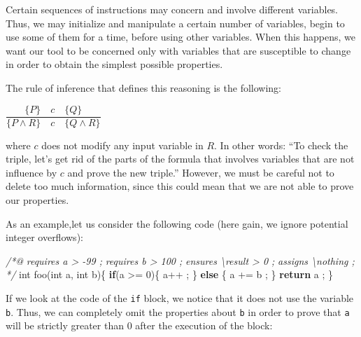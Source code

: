 \documentclass[12pt,francais,]{scrbook}
\newenvironment{Shaded}{}{}
\newcommand{\KeywordTok}[1]{\textcolor[rgb]{0.00,0.44,0.13}{\textbf{{#1}}}}
\newcommand{\DataTypeTok}[1]{\textcolor[rgb]{0.56,0.13,0.00}{{#1}}}
\newcommand{\DecValTok}[1]{\textcolor[rgb]{0.25,0.63,0.44}{{#1}}}
\newcommand{\CommentTok}[1]{\textcolor[rgb]{0.38,0.63,0.69}{\textit{{#1}}}}
\newcommand{\NormalTok}[1]{{#1}}
\begin{document}
Certain sequences of instructions may concern and involve different
variables. Thus, we may initialize and manipulate a certain number of
variables, begin to use some of them for a time, before using other
variables. When this happens, we want our tool to be concerned only with
variables that are susceptible to change in order to obtain the simplest
possible properties.

The rule of inference that defines this reasoning is the following:

\begin{center}
\(\dfrac{\{P\}\quad c\quad \{Q\}}{\{P \wedge R\}\quad c\quad \{Q \wedge R\}}\)
\end{center}

where \(c\) does not modify any input variable in \(R\). In other words:
``To check the triple, let's get rid of the parts of the formula that
involves variables that are not influence by \(c\) and prove the new
triple.'' However, we must be careful not to delete too much
information, since this could mean that we are not able to prove our
properties.

\clearpage 
As an example,let us consider the following code (here gain, we ignore
potential integer overflows):

\begin{footnotesize}\begin{Shaded}
\begin{Highlighting}[]
\CommentTok{/*@}
\CommentTok{  requires a > -99 ;}
\CommentTok{  requires b > 100 ;}
\CommentTok{  ensures  \textbackslash{}result > 0 ;}
\CommentTok{  assigns  \textbackslash{}nothing ;}
\CommentTok{*/}
\DataTypeTok{int} \NormalTok{foo(}\DataTypeTok{int} \NormalTok{a, }\DataTypeTok{int} \NormalTok{b)\{}
  \KeywordTok{if}\NormalTok{(a >= }\DecValTok{0}\NormalTok{)\{}
    \NormalTok{a++ ;}
  \NormalTok{\} }\KeywordTok{else} \NormalTok{\{}
    \NormalTok{a += b ;}
  \NormalTok{\}}
  \KeywordTok{return} \NormalTok{a ;}
\NormalTok{\}}
\end{Highlighting}
\end{Shaded}\end{footnotesize}

If we look at the code of the \texttt{if} block, we notice that it does
not use the variable \texttt{b}. Thus, we can completely omit the
properties about \texttt{b} in order to prove that \texttt{a} will be
strictly greater than 0 after the execution of the block:
\end{document}

